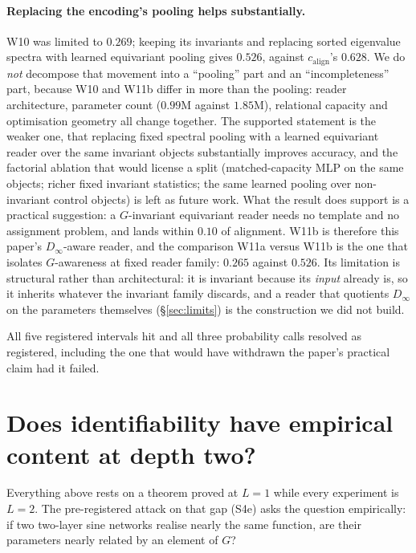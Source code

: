 \documentclass[10pt,twocolumn,letterpaper]{article}
\theoremstyle{definition}
\newcommand{\Dinf}{D_\infty}
\newcommand{\calign}{c_{\mathrm{align}}}
\begin{document}
\paragraph{Replacing the encoding's pooling helps substantially.} W10 was limited to $0.269$;
keeping its invariants and replacing sorted eigenvalue spectra with learned equivariant pooling
gives $0.526$, against $\calign$'s $0.628$. We do \emph{not} decompose that movement into a
``pooling'' part and an ``incompleteness'' part, because W10 and W11b differ in more than the
pooling: reader architecture, parameter count ($0.99$M against $1.85$M), relational capacity and
optimisation geometry all change together. The supported statement is the weaker one, that replacing
fixed spectral pooling with a learned equivariant reader over the same invariant objects
substantially improves accuracy, and the factorial ablation that would license a split
(matched-capacity MLP on the same objects; richer fixed invariant statistics; the same learned
pooling over non-invariant control objects) is left as future work. What the result does support is
a practical suggestion: a $G$-invariant equivariant reader needs no template and no assignment
problem, and lands within $0.10$ of alignment. W11b is therefore this paper's $\Dinf$-aware reader,
and the comparison W11a versus W11b is the one that isolates $G$-awareness at fixed reader family: $0.265$ against $0.526$. Its limitation is structural rather than architectural: it is invariant
because its \emph{input} already is, so it inherits whatever the invariant family discards, and a
reader that quotients $\Dinf$ on the parameters themselves (\S\ref{sec:limits}) is the construction
we did not build.

All five registered intervals hit and all three probability calls resolved as registered, including
the one that would have withdrawn the paper's practical claim had it failed.

\section{Does identifiability have empirical content at depth two?}\label{sec:s4e}

Everything above rests on a theorem proved at $L=1$ while every experiment is $L=2$. The
pre-registered attack on that gap (S4e) asks the question empirically: if two two-layer sine
networks realise nearly the same function, are their parameters nearly related by an element of
$G$?
\end{document}
